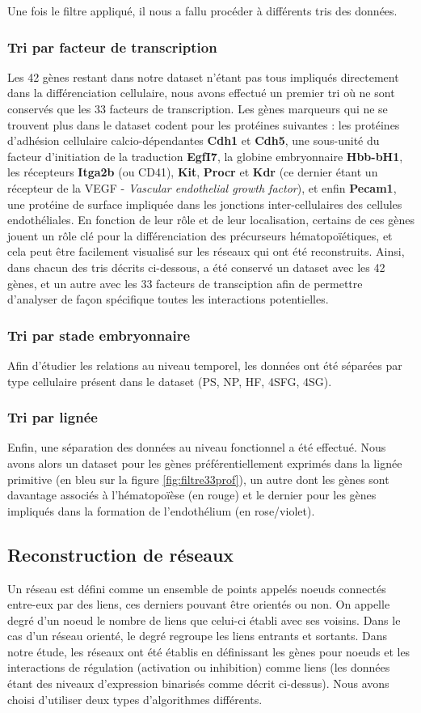 \documentclass[fleqn,11pt]{SelfArx} %
\begin{document}
Une fois le filtre appliqué, il nous a fallu procéder à différents tris des données. 
\subsubsection{Tri par facteur de transcription}
Les 42 gènes restant dans notre dataset n'étant pas tous impliqués directement dans la différenciation cellulaire, nous avons effectué un premier tri où ne sont conservés que les 33 facteurs de transcription. Les gènes marqueurs qui ne se trouvent plus dans le dataset codent pour les protéines suivantes : les protéines d'adhésion cellulaire calcio-dépendantes \textbf{Cdh1} et \textbf{Cdh5}, une sous-unité du facteur d'initiation de la traduction 
\textbf{EgfI7}, la globine embryonnaire \textbf{Hbb-bH1}, les récepteurs \textbf{Itga2b} (ou CD41), \textbf{Kit}, \textbf{Procr} et \textbf{Kdr} (ce dernier étant un récepteur de la VEGF - \textit{Vascular endothelial growth factor}), et enfin \textbf{Pecam1}, une protéine de surface impliquée dans les jonctions inter-cellulaires des cellules endothéliales. En fonction de leur rôle et de leur localisation, certains de ces gènes jouent un rôle clé pour la différenciation des précurseurs hématopoïétiques, et cela peut être facilement visualisé sur les réseaux qui ont été reconstruits. Ainsi, dans chacun des tris décrits ci-dessous, a été conservé un dataset avec les 42 gènes, et un autre avec les 33 facteurs de transciption afin de permettre d'analyser de façon spécifique toutes les interactions potentielles.
\subsubsection{Tri par stade embryonnaire}
Afin d'étudier les relations au niveau temporel, les données ont été séparées par type cellulaire présent dans le dataset (PS, NP, HF, 4SFG, 4SG). 
\subsubsection{Tri par lignée}
Enfin, une séparation des données au niveau fonctionnel a été effectué. Nous avons alors un dataset pour les gènes préférentiellement exprimés dans la lignée primitive (en bleu sur la figure \ref{fig:filtre33prof}), un autre dont les gènes sont davantage associés à l'hématopoïèse (en rouge) et le dernier pour les gènes impliqués dans la formation de l'endothélium (en rose/violet).


\subsection{Reconstruction de réseaux}
Un réseau est défini comme un ensemble de points appelés noeuds connectés entre-eux par des liens, ces derniers pouvant être orientés ou non. On appelle degré d'un noeud le nombre de liens que celui-ci établi avec ses voisins. Dans le cas d'un réseau orienté, le degré regroupe les liens entrants et sortants. Dans notre étude, les réseaux ont été établis en définissant les gènes pour noeuds et les interactions de régulation (activation ou inhibition) comme liens (les données étant des niveaux d'expression binarisés comme décrit ci-dessus). Nous avons choisi d'utiliser deux types d'algorithmes différents.
\end{document}
